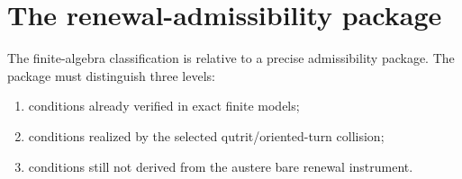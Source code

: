 \documentclass[11pt,oneside,openany]{book}
\numberwithin{equation}{chapter}
\theoremstyle{definition}
\theoremstyle{remark}
\begin{document}
\chapter{The renewal-admissibility package}
\label{ch:admissibility}

The finite-algebra classification is relative to a precise admissibility
package.  The package must distinguish three levels:

\begin{enumerate}[label=\textup{(\roman*)},leftmargin=2.2em]
\item conditions already verified in exact finite models;
\item conditions realized by the selected qutrit/oriented-turn collision;
\item conditions still not derived from the austere bare renewal instrument.
\end{enumerate}
\end{document}
